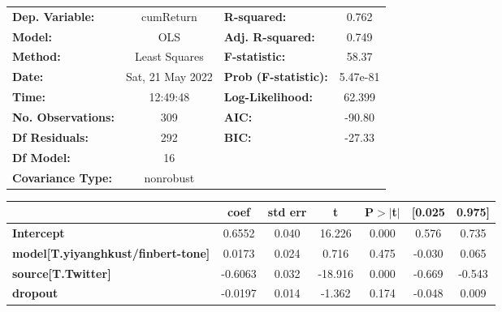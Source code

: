 \begin{center}
\begin{tabular}{lclc}
\toprule
\textbf{Dep. Variable:}                    &    cumReturn     & \textbf{  R-squared:         } &     0.762   \\
\textbf{Model:}                            &       OLS        & \textbf{  Adj. R-squared:    } &     0.749   \\
\textbf{Method:}                           &  Least Squares   & \textbf{  F-statistic:       } &     58.37   \\
\textbf{Date:}                             & Sat, 21 May 2022 & \textbf{  Prob (F-statistic):} &  5.47e-81   \\
\textbf{Time:}                             &     12:49:48     & \textbf{  Log-Likelihood:    } &    62.399   \\
\textbf{No. Observations:}                 &         309      & \textbf{  AIC:               } &    -90.80   \\
\textbf{Df Residuals:}                     &         292      & \textbf{  BIC:               } &    -27.33   \\
\textbf{Df Model:}                         &          16      & \textbf{                     } &             \\
\textbf{Covariance Type:}                  &    nonrobust     & \textbf{                     } &             \\
\bottomrule
\end{tabular}
\begin{tabular}{lcccccc}
                                           & \textbf{coef} & \textbf{std err} & \textbf{t} & \textbf{P$> |$t$|$} & \textbf{[0.025} & \textbf{0.975]}  \\
\midrule
\textbf{Intercept}                         &       0.6552  &        0.040     &    16.226  &         0.000        &        0.576    &        0.735     \\
\textbf{model[T.yiyanghkust/finbert-tone]} &       0.0173  &        0.024     &     0.716  &         0.475        &       -0.030    &        0.065     \\
\textbf{source[T.Twitter]}                 &      -0.6063  &        0.032     &   -18.916  &         0.000        &       -0.669    &       -0.543     \\
\textbf{dropout}                           &      -0.0197  &        0.014     &    -1.362  &         0.174        &       -0.048    &        0.009     \\

\end{tabular}
\end{center}
